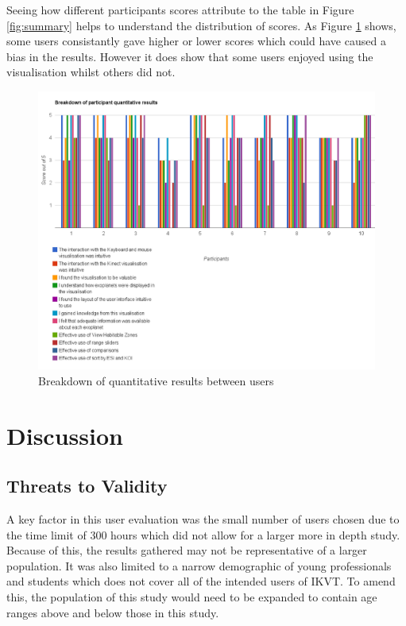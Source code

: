 Seeing how different participants scores attribute to the table in Figure
\ref{fig:summary} helps to understand the distribution of scores. As Figure
\ref{fig:breakdown} shows, some users consistantly gave higher or lower scores
which could have caused a bias in the results. However it does show that some
users enjoyed using the visualisation whilst others did not. 
    
\begin{figure}[H]
  \includegraphics[width=1\textwidth]{images/breakdown.pdf}
  \caption{Breakdown of quantitative results between users}  
    \label{fig:breakdown}
\end{figure}

\section{Discussion}
\subsection{Threats to Validity}
A key factor in this user evaluation was the small number of users
chosen due to the time limit of 300 hours which did not allow for a larger more
in depth study. Because of this, the results gathered may
not be representative of a larger population. It was also limited to a narrow
demographic of young professionals and students which does not cover all of the
intended users of IKVT. To amend this, the population of this study would need to
be expanded to contain age ranges above and below those in this study.

